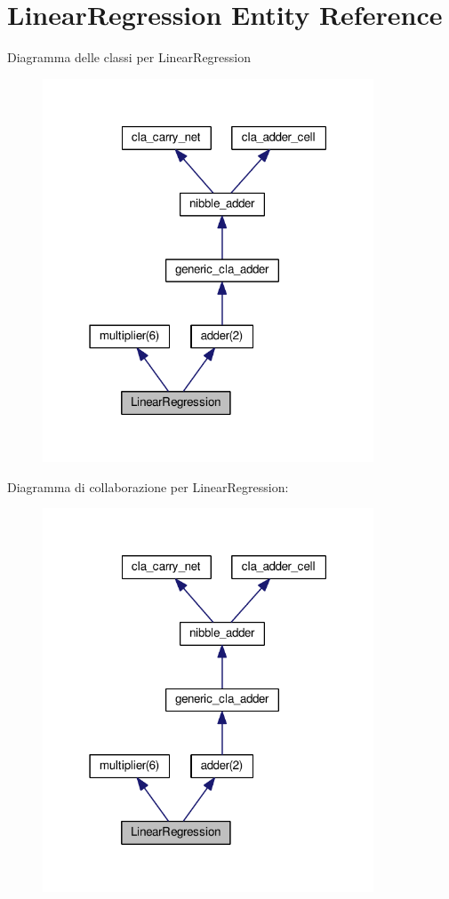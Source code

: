 \hypertarget{class_linear_regression}{}\section{Linear\+Regression Entity Reference}
\label{class_linear_regression}


Diagramma delle classi per Linear\+Regression
\nopagebreak
\begin{figure}[H]
\begin{center}
\leavevmode
\includegraphics[width=279pt]{class_linear_regression__inherit__graph}
\end{center}
\end{figure}


Diagramma di collaborazione per Linear\+Regression\+:
\nopagebreak
\begin{figure}[H]
\begin{center}
\leavevmode
\includegraphics[width=279pt]{class_linear_regression__coll__graph}
\end{center}
\end{figure}
